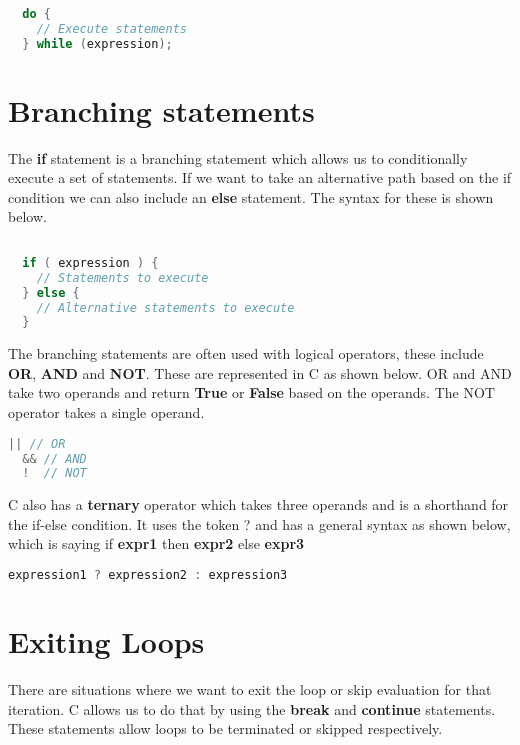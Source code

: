 \documentclass[11pt,a4paper,oneside]{book}
\begin{document}
\begin{lstlisting}[language=C, title=Do while loop]
  
  do {
    // Execute statements  
  } while (expression);
\end{lstlisting}

\section{Branching statements}
\noindent The \textbf{if} statement is a branching statement which allows us to 
conditionally execute a set of statements. If we want to take an alternative path
based on the if condition we can also include an \textbf{else} statement. The 
syntax for these is shown below. 

\begin{lstlisting}[language=C, title=Branching statements]
  
  if ( expression ) {
    // Statements to execute 
  } else {
    // Alternative statements to execute  
  }
\end{lstlisting}

\noindent The branching statements are often used with logical operators, these
include \textbf{OR}, \textbf{AND} and \textbf{NOT}. These are represented in C as
shown below. OR and AND take two operands and return \textbf{True} or \textbf{False}
based on the operands. The NOT operator takes a single operand.

\begin{lstlisting}[language=C]
  || // OR
  && // AND
  !  // NOT
\end{lstlisting}

\noindent C also has a \textbf{ternary} operator which takes three operands and is 
a shorthand for the if-else condition. It uses the token ? and has a general syntax
as shown below, which is saying if \textbf{expr1} then \textbf{expr2} else \textbf{expr3}

\begin{lstlisting}[language=C]
  expression1 ? expression2 : expression3
\end{lstlisting}

\section{Exiting Loops}
\noindent There are situations where we want to exit the loop or skip evaluation for
that iteration. C allows us to do that by using the \textbf{break} and \textbf{continue}
statements. These statements allow loops to be terminated or skipped respectively.\\
\end{document}
